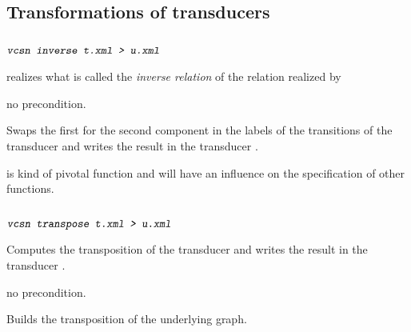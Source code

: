 %


\SetTwClPrm{\TwClOne}%
\subsection{Transformations of transducers}

\subsubsection{}

\begin{SwClCmd}
\begin{shell}
$ \textsl{\texttt{vcsn inverse t.xml > u.xml}}
$
\end{shell}%
\end{SwClCmd}%
\begin{SwClTxt}
     realizes what is called the \emph{inverse relation} of 
    the relation realized by 
\end{SwClTxt}%

\Prec no precondition.

\Spec
Swaps the first for the second component in the labels of the 
transitions of the transducer  and writes the result 
in the transducer . 

\Comt
{} is kind of pivotal function and 
will have an influence on the specification of other functions.

\subsubsection{}
\label{ssc:fmp-tra}


\begin{SwClCmd}
\begin{shell}
$ \textsl{\texttt{vcsn transpose t.xml > u.xml}}
$
\end{shell}%
\end{SwClCmd}%
\begin{SwClTxt}
    Computes the transposition of the transducer 
     and writes the result 
    in the transducer . 
\end{SwClTxt}%

\Prec no precondition.

\Spec
\thi Builds the transposition of the underlying graph.

